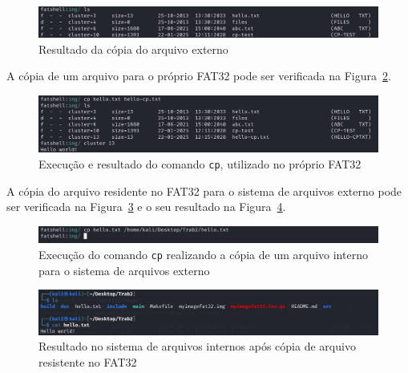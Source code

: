 \documentclass[
    12pt,				%
    oneside,   	        %
    a4paper,			%
    english,			%
    french,				%
    spanish,			%
    brazil,				%
    ]{pacotes/abntex2}
\begin{document}
\begin{figure}[H]
    \centering
    \includegraphics[width=450pt]{figuras/resultados/3.2-cp-externo-interno.PNG}
    \caption{Resultado da cópia do arquivo externo}
    \label{fig:cp-externo-interno-2}
\end{figure}

A cópia de um arquivo para o próprio FAT32 pode ser verificada na Figura~\ref{fig:cp-interno-attr}.

\begin{figure}[H]
    \centering
    \includegraphics[width=450pt]{figuras/resultados/5-cp-interno-attr.PNG}
    \caption{Execução e resultado do comando \texttt{cp}, utilizado no próprio FAT32}
    \label{fig:cp-interno-attr}
\end{figure}

A cópia do arquivo residente no FAT32 para o sistema de arquivos externo pode ser verificada na Figura~\ref{fig:cp-interno-externo-1} e o seu resultado na Figura~\ref{fig:cp-interno-externo-2}.

\begin{figure}[H]
    \centering
    \includegraphics[width=450pt]{figuras/resultados/6-cp-interno-externo.PNG}
    \caption{Execução do comando \texttt{cp} realizando a cópia de um arquivo interno para o sistema de arquivos externo}
    \label{fig:cp-interno-externo-1}
\end{figure}

\begin{figure}[H]
    \centering
    \includegraphics[width=450pt]{figuras/resultados/7-cp-arquivo-externo-resultado.PNG}
    \caption{Resultado no sistema de arquivos internos após cópia de arquivo resistente no FAT32}
    \label{fig:cp-interno-externo-2}
\end{figure}
\end{document}
